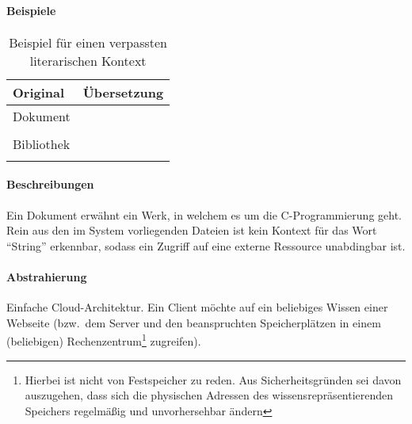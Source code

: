 \paragraph*{Beispiele}
\begin{table}[h!]
    \centering
    \begin{tabularx}{\textwidth}{X X}
        \toprule
            Original & Übersetzung\\
        \midrule
            Dokument & \\
             & \\[2em]
            Bibliothek & \\
             & \\
        \bottomrule
    \end{tabularx}
    \caption{Beispiel für einen verpassten literarischen Kontext}\label{tab:problems:nonexisting}%
\end{table}

\paragraph*{Beschreibungen}
Ein Dokument erwähnt ein Werk, in welchem es um die C-Programmierung geht. Rein aus den im System vorliegenden Dateien ist kein Kontext für das Wort \enquote{String} erkennbar, sodass ein Zugriff auf eine externe Ressource unabdingbar ist.

\paragraph*{Abstrahierung}
Einfache Cloud-Architektur. Ein Client möchte auf ein beliebiges Wissen einer Webseite (bzw.\ dem Server und den beanspruchten Speicherplätzen in einem (beliebigen) Rechenzentrum\footnote{Hierbei ist nicht von Festspeicher zu reden. Aus Sicherheitsgründen sei davon auszugehen, dass sich die physischen Adressen des wissensrepräsentierenden Speichers regelmäßig und unvorhersehbar ändern} zugreifen).


